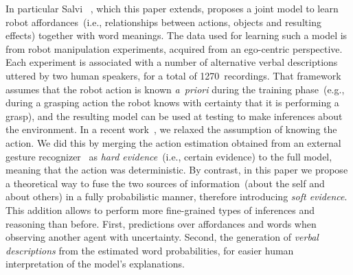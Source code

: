 In particular Salvi \etal{}~\cite{salvi:2012:smcb}, which this paper extends, proposes a joint model to learn robot affordances~(i.e., relationships between actions, objects and resulting effects) together with word meanings.
The data used for learning such a model is from robot manipulation experiments, acquired from an ego-centric perspective.
Each experiment is associated with a number of alternative verbal descriptions uttered by two human speakers, for a total of 1270~recordings.
That framework assumes that the robot action is known \emph{a~priori} during the training phase~(e.g., during a grasping action the robot knows with certainty that it is performing a grasp), and the resulting model can be used at testing to make inferences about the environment.
In a recent work~\cite{saponaro:2017:glu}, we relaxed the assumption of knowing the action.
We did this by merging the action estimation obtained from an external gesture recognizer~\cite{saponaro:2013:crhri} as \emph{hard evidence}~(i.e., certain evidence) to the full model, meaning that the action was deterministic.
By contrast, in this paper we propose a theoretical way to fuse the two sources of information~(about the self and about others) in a fully probabilistic manner, therefore introducing \emph{soft evidence}.
This addition allows to perform more fine-grained types of inferences and reasoning than before.
First, predictions over affordances and words when observing another agent with uncertainty.
Second, the generation of \emph{verbal descriptions} from the estimated word probabilities, for easier human interpretation of the model's explanations.
